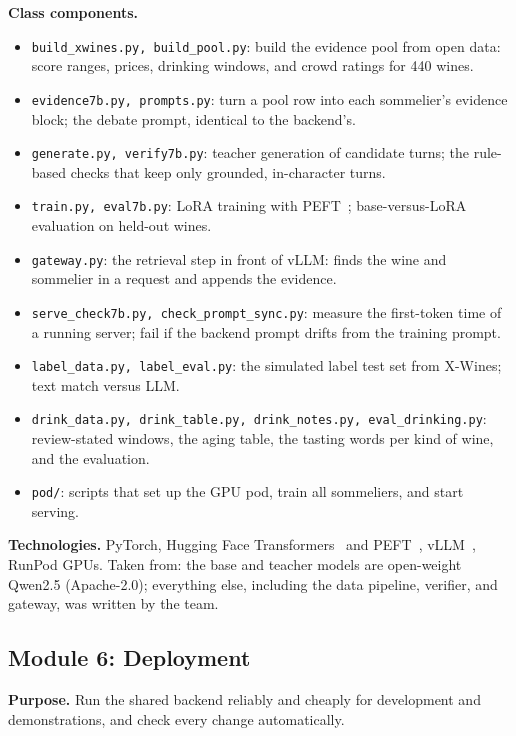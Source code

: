 \documentclass[conference]{IEEEtran}
\begin{document}
\textbf{Class components.}
\begin{itemize}
    \item \texttt{build\_xwines.py, build\_pool.py}: build the evidence pool from open data: score ranges, prices, drinking windows, and crowd ratings for 440 wines.
    \item \texttt{evidence7b.py, prompts.py}: turn a pool row into each sommelier's evidence block; the debate prompt, identical to the backend's.
    \item \texttt{generate.py, verify7b.py}: teacher generation of candidate turns; the rule-based checks that keep only grounded, in-character turns.
    \item \texttt{train.py, eval7b.py}: LoRA training with PEFT~\cite{peft}; base-versus-LoRA evaluation on held-out wines.
    \item \texttt{gateway.py}: the retrieval step in front of vLLM: finds the wine and sommelier in a request and appends the evidence.
    \item \texttt{serve\_check7b.py, check\_prompt\_sync.py}: measure the first-token time of a running server; fail if the backend prompt drifts from the training prompt.
    \item \texttt{label\_data.py, label\_eval.py}: the simulated label test set from X-Wines; text match versus LLM.
    \item \texttt{drink\_data.py, drink\_table.py, drink\_notes.py, eval\_drinking.py}: review-stated windows, the aging table, the tasting words per kind of wine, and the evaluation.
    \item \texttt{pod/}: scripts that set up the GPU pod, train all sommeliers, and start serving.
\end{itemize}

\textbf{Technologies.} PyTorch, Hugging Face Transformers~\cite{transformers} and PEFT~\cite{peft}, vLLM~\cite{vllm}, RunPod GPUs. Taken from: the base and teacher models are open-weight Qwen2.5 (Apache-2.0); everything else, including the data pipeline, verifier, and gateway, was written by the team.

\subsection{Module 6: Deployment}
\textbf{Purpose.} Run the shared backend reliably and cheaply for development and demonstrations, and check every change automatically.
\end{document}
